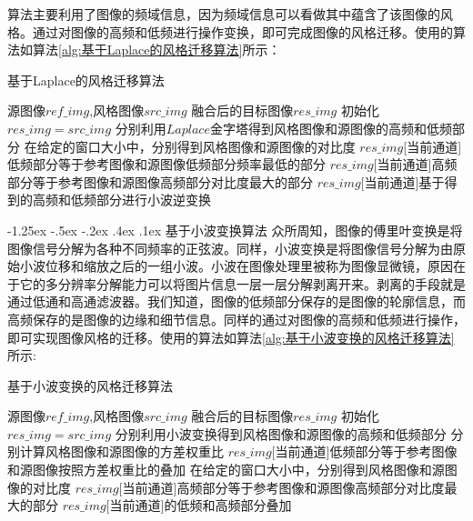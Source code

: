 \documentclass[a4paper, 11pt]{article}
\makeatletter
\newcommand{\xiaosihao}{\fontsize{12pt}{\baselineskip}\selectfont}
\renewcommand\subsection{\@startsection{subsection}{1}{\z@}%
{-1.25ex \@plus -.5ex \@minus -.2ex}%
{.4ex \@plus .1ex}%
{\normalfont\xiaosihao\CJKfamily{hei}}}
\makeatother
\begin{document}
算法主要利用了图像的频域信息，因为频域信息可以看做其中蕴含了该图像的风格。通过对图像的高频和低频进行操作变换，即可完成图像的风格迁移。使用的算法如算法\ref{alg:基于Laplace的风格迁移算法}所示：

\begin{algorithm}[H]
\caption{基于Laplace的风格迁移算法}  
\label{alg:基于Laplace的风格迁移算法}  
\begin{algorithmic}[1]
    \REQUIRE 源图像$ref\_img$,风格图像$src\_img$
    \ENSURE 融合后的目标图像$res\_img$
    \STATE 初始化 $res\_img=src\_img$
    \STATE 分别利用$Laplace$金字塔得到风格图像和源图像的高频和低频部分
    \STATE 在给定的窗口大小中，分别得到风格图像和源图像的对比度
    \STATE $res\_img$[当前通道]低频部分等于参考图像和源图像低频部分频率最低的部分
    \STATE $res\_img$[当前通道]高频部分等于参考图像和源图像高频部分对比度最大的部分
    \STATE $res\_img$[当前通道]基于得到的高频和低频部分进行小波逆变换
    \ENDFOR 
\end{algorithmic}  
\end{algorithm}

\subsection{基于小波变换算法}
 众所周知，图像的傅里叶变换是将图像信号分解为各种不同频率的正弦波。同样，小波变换是将图像信号分解为由原始小波位移和缩放之后的一组小波。小波在图像处理里被称为图像显微镜，原因在于它的多分辨率分解能力可以将图片信息一层一层分解剥离开来。剥离的手段就是通过低通和高通滤波器。我们知道，图像的低频部分保存的是图像的轮廓信息，而高频保存的是图像的边缘和细节信息。同样的通过对图像的高频和低频进行操作，即可实现图像风格的迁移\cite{trad}。使用的算法如算法\ref{alg:基于小波变换的风格迁移算法}所示:
\begin{algorithm}[H]
\caption{基于小波变换的风格迁移算法}  
\label{alg:基于小波变换的风格迁移算法}  
\begin{algorithmic}[1]
    \REQUIRE 源图像$ref\_img$,风格图像$src\_img$
    \ENSURE 融合后的目标图像$res\_img$
    \STATE 初始化 $res\_img=src\_img$
    \STATE 分别利用小波变换得到风格图像和源图像的高频和低频部分
    \STATE 分别计算风格图像和源图像的方差权重比
    \STATE $res\_img$[当前通道]低频部分等于参考图像和源图像按照方差权重比的叠加
    \STATE 在给定的窗口大小中，分别得到风格图像和源图像的对比度
    \STATE $res\_img$[当前通道]高频部分等于参考图像和源图像高频部分对比度最大的部分
    \STATE $res\_img$[当前通道]的低频和高频部分叠加
    \ENDFOR 
\end{algorithmic}  
\end{algorithm}
\end{document}
